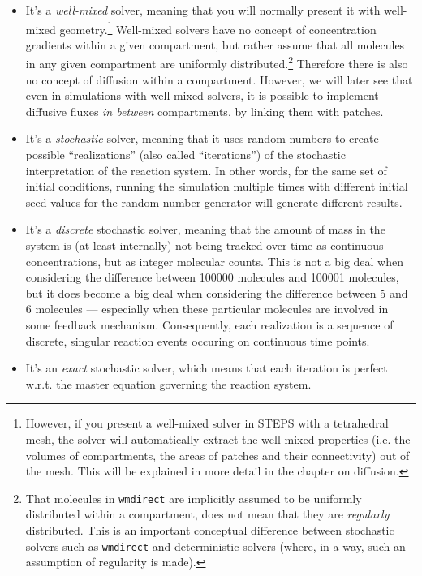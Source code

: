 \documentclass[a4paper,12pt]{book}
\begin{document}
\begin{itemize}
\item It's a \emph{well-mixed} solver, meaning that you will normally present it with well-mixed geometry.\footnote{However, if you present a well-mixed solver in STEPS with a tetrahedral mesh, the solver will automatically extract the well-mixed properties (i.e. the volumes of compartments, the areas of patches and their connectivity) out of the mesh. This will be explained in more detail in the chapter on diffusion.} Well-mixed solvers have no concept of concentration gradients within a given compartment, but rather assume that all molecules in any given compartment are uniformly distributed.\footnote{That molecules in \texttt{wmdirect} are implicitly assumed to be uniformly distributed within a compartment, does not mean that they are \emph{regularly} distributed. This is an important conceptual difference between stochastic solvers such as \texttt{wmdirect} and deterministic solvers (where, in a way, such an assumption of regularity is made).} Therefore there is also no concept of diffusion within a compartment. However, we will later see that even in simulations with well-mixed solvers, it is possible to implement diffusive fluxes \emph{in between} compartments, by linking them with patches.
\item It's a \emph{stochastic} solver, meaning that it uses random numbers to create possible ``realizations'' (also called ``iterations'') of the stochastic interpretation of the reaction system. In other words, for the same set of initial conditions, running the simulation multiple times with different initial seed values for the random number generator will generate different results. 
\item It's a \emph{discrete} stochastic solver, meaning that the amount of mass in the system is (at least internally) not being tracked over time as continuous concentrations, but as integer molecular counts. This is not a big deal when considering the difference between 100000 molecules and 100001 molecules, but it does become a big deal when considering the difference between 5 and 6 molecules --- especially when these particular molecules are involved in some feedback mechanism. Consequently, each realization is a sequence of discrete, singular reaction events occuring on continuous time points.
\item It's an \emph{exact} stochastic solver, which means that each iteration is perfect w.r.t. the master equation governing the reaction system. 
\end{itemize}
\end{document}
